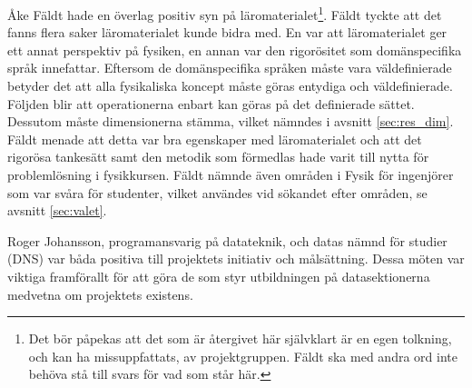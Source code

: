 Åke Fäldt hade en överlag positiv syn på läromaterialet\footnote{Det bör
påpekas att det som är återgivet här självklart är en egen tolkning, och kan ha
missuppfattats, av projektgruppen. Fäldt ska med andra ord inte behöva stå till
svars för vad som står här.}. Fäldt tyckte att det fanns flera saker
läromaterialet kunde bidra med. En var att läromaterialet ger ett annat
perspektiv på fysiken, en annan var den rigorösitet som
domänspecifika språk innefattar. Eftersom de domänspecifika språken måste vara
väldefinierade betyder det att alla fysikaliska koncept måste göras entydiga och väldefinierade. 
Följden blir att operationerna enbart kan göras på det definierade sättet. 
Dessutom måste dimensionerna stämma, vilket nämndes i avsnitt \ref{sec:res_dim}.
Fäldt menade att detta var bra egenskaper med läromaterialet och att det rigorösa
tankesätt samt den metodik som förmedlas hade varit till nytta för problemlösning i
fysikkursen. Fäldt nämnde även områden i Fysik för ingenjörer som var
svåra för studenter, vilket användes vid sökandet efter områden, se avsnitt \ref{sec:valet}.

Roger Johansson, programansvarig på datateknik, och datas nämnd för studier (DNS)
var båda positiva till projektets initiativ och målsättning. Dessa möten var viktiga framförallt
för att göra de som styr utbildningen på datasektionerna medvetna om projektets existens.
